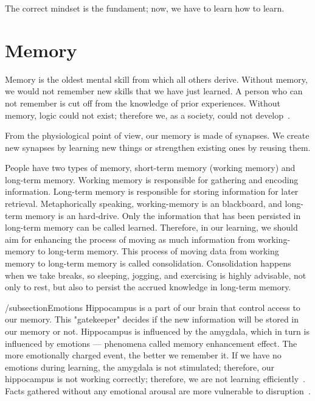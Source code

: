 \documentclass{article}
\begin{document}
The correct mindset is the fundament; now, we have to learn how to learn.

\section{Memory}
Memory is the oldest mental skill from which all others derive. Without memory, we would not remember new skills that we have just learned. A person who can not remember is cut off from the knowledge of prior experiences. Without memory, logic could not exist; therefore we, as a society, could not develop~\cite{csikszentmihalyi1990flow}.

From the physiological point of view, our memory is made of synapses. We create new synapses by learning new things or strengthen existing ones by reusing them.

People have two types of memory, short-term memory (working memory) and long-term memory. Working memory is responsible for gathering and encoding information. Long-term memory is responsible for storing information for later retrieval. Metaphorically speaking, working-memory is an blackboard, and long-term memory is an hard-drive. Only the information that has been persisted in long-term memory can be called learned. Therefore, in our learning, we should aim for enhancing the process of moving as much information from working-memory to long-term memory. This process of moving data from working memory to long-term memory is called consolidation. Consolidation happens when we take breaks, so sleeping, jogging, and exercising is highly advisable, not only to rest, but also to persist the accrued knowledge in long-term memory.


/subsection{Emotions}
Hippocampus is a part of our brain that control access to our memory. This "gatekeeper" decides if the new information will be stored in our memory or not. Hippocampus is influenced by the amygdala, which in turn is influenced by emotions — phenomena called memory enhancement effect. The more emotionally charged event, the better we remember it. If we have no emotions during learning, the amygdala is not stimulated; therefore, our hippocampus is not working correctly; therefore, we are not learning efficiently~\cite{phelps2004human, tyng2017influences}. Facts gathered without any emotional arousal are more vulnerable to disruption~\cite{doi:10.1111/1467-9280.00090}.
\end{document}
